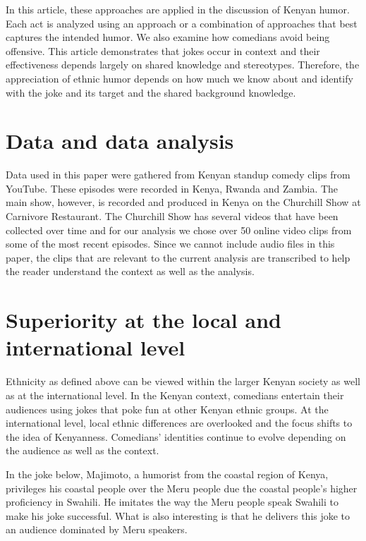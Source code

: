 \documentclass[output=paper]{langsci/langscibook}
\begin{document}
   In this article, these approaches are applied in the discussion of Kenyan humor. Each act is analyzed using an approach or a combination of approaches that best captures the intended humor. We also examine how comedians avoid being offensive. This article demonstrates that jokes occur in context and their effectiveness depends largely on shared knowledge and stereotypes. Therefore, the appreciation of ethnic humor depends on how much we know about and identify with the joke and its target and the shared background knowledge. 

\section{ Data and data analysis}

   Data used in this paper were gathered from Kenyan standup comedy clips from YouTube. These episodes were recorded in Kenya, Rwanda and Zambia. The main show, however, is recorded and produced in Kenya on the Churchill Show at Carnivore Restaurant. The Churchill Show has several videos that have been collected over time and for our analysis we chose over 50 online video clips from some of the most recent episodes. Since we cannot include audio files in this paper, the clips that are relevant to the current analysis are transcribed to help the reader understand the context as well as the analysis. 

\section{Superiority at the local and international level}

  Ethnicity as defined above can be viewed within the larger Kenyan society as well as at the international level. In the Kenyan context, comedians entertain their audiences using jokes that poke fun at other Kenyan ethnic groups. At the international level, local ethnic differences are overlooked and the focus shifts to the idea of Kenyanness. Comedians’ identities continue to evolve depending on the audience as well as the context.

   In the joke below, Majimoto, a humorist from the coastal region of Kenya, privileges his coastal people over the Meru people due the coastal people’s higher proficiency in Swahili. He imitates the way the Meru people speak Swahili to make his joke successful. What is also interesting is that he delivers this joke to an audience dominated by Meru speakers.
\end{document}
